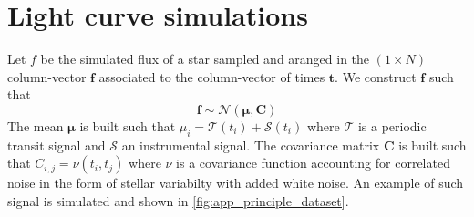 \documentclass{aastex631}
\begin{document}
\newpage
\appendix
\section{Light curve simulations}\label{app_principle_simulations}



Let $f$ be the simulated flux of a star sampled and aranged in the $(1\times N)$ column-vector $\bm{f}$ associated to the column-vector of times $\bm{t}$. We construct $\bm{f}$ such that
$$
    \bm{f} \sim \mathcal{N}(\bm{\mu}, \bm{C})
$$
The mean $\bm{\mu}$ is built such that $\mu_i = \mathcal{T}(t_i) + \mathcal{S}(t_i)$ where $\mathcal{T}$ is a periodic transit signal and $\mathcal{S}$ an instrumental signal. The covariance matrix $\bm{C}$ is built such that $C_{i, j} = \nu(t_i, t_j)$ where $\nu$ is a covariance function accounting for correlated noise in the form of stellar variabilty with added white noise. An example of such signal is simulated and shown in \autoref{fig:app_principle_dataset}.
\end{document}
